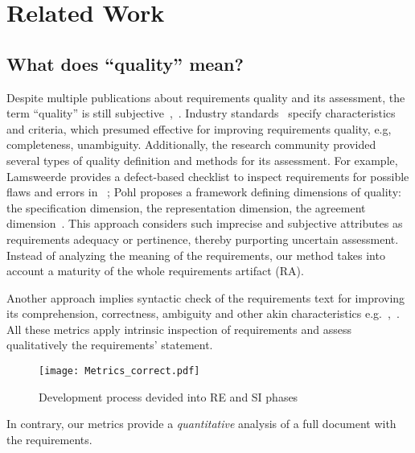 \section{Related Work}
\label{sec:relatedwork} 

\subsection{What does ``quality'' mean?}

Despite multiple publications about requirements quality and its assessment, 
the term ``quality'' is still subjective~\cite{Mund:2017},~\cite{Femmer:2017}. 
Industry standards~\cite{ISO/IEC/IEEE:2011} specify characteristics and criteria, 
which presumed effective for improving requirements quality, e.g, completeness, unambiguity. 
Additionally, the research community provided several types of quality definition and methods for its assessment. 
For example, Lamsweerde provides a defect-based checklist to inspect requirements for possible flaws 
and errors in ~\cite{Lamsweerde:2009}; Pohl proposes a framework defining dimensions of quality: 
the specification dimension, the representation dimension, the agreement dimension~\cite{POHL:1994}.
This approach considers such imprecise and subjective attributes as requirements adequacy or pertinence, thereby purporting uncertain assessment.
Instead of analyzing the meaning of the requirements, our method takes into account a maturity of the whole requirements artifact (RA).


Another approach implies syntactic check of the requirements text for improving its comprehension, 
correctness, ambiguity and other akin characteristics e.g.~\cite{Ferrari:2014},~\cite{Berry:2006}.
All these metrics apply intrinsic inspection of requirements and assess qualitatively the requirements' statement. 

\begin{figure}[H]
	\centering
		\texttt{[image: Metrics\_correct.pdf]}
	\caption{Development process devided into RE and SI phases}
	\label{fig:Metrics_shot}
\end{figure}

In contrary, our metrics provide a \textit{quantitative} analysis of a full document with the requirements.

